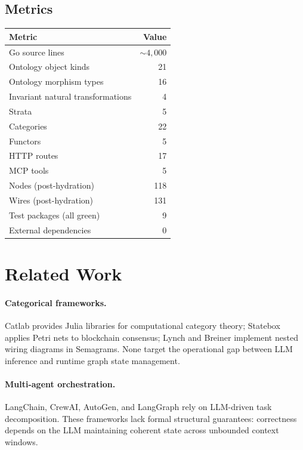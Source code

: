 \documentclass[submission,copyright,creativecommons]{eptcs}
\begin{document}
\subsection{Metrics}

\begin{center}
\begin{tabular}{@{}lr@{}}
\toprule
Metric & Value \\
\midrule
Go source lines & ${\sim}4{,}000$ \\
Ontology object kinds & 21 \\
Ontology morphism types & 16 \\
Invariant natural transformations & 4 \\
Strata & 5 \\
Categories & 22 \\
Functors & 5 \\
HTTP routes & 17 \\
MCP tools & 5 \\
Nodes (post-hydration) & 118 \\
Wires (post-hydration) & 131 \\
Test packages (all green) & 9 \\
External dependencies & 0 \\
\bottomrule
\end{tabular}
\end{center}

\section{Related Work}
\label{sec:related}

\paragraph{Categorical frameworks.}
Catlab \cite{catlab2024} provides Julia libraries for computational category
theory; Statebox \cite{statebox2019} applies Petri nets to blockchain
consensus; Lynch and Breiner \cite{lynch2023nested} implement nested wiring
diagrams in Semagrams. None target the operational gap between LLM inference
and runtime graph state management.

\paragraph{Multi-agent orchestration.}
LangChain, CrewAI, AutoGen, and LangGraph rely on LLM-driven task
decomposition. These frameworks lack formal structural guarantees: correctness
depends on the LLM maintaining coherent state across unbounded context windows.
\end{document}
